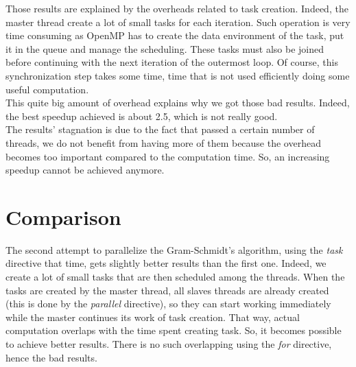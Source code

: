 Those results are explained by the overheads related to task creation. Indeed, the master thread create a lot of small tasks for each iteration. Such operation is very time consuming as OpenMP has to create the data environment of the task, put it in the queue and manage the scheduling.  These tasks must also be joined before continuing with the next iteration of the outermost loop. Of course, this synchronization step takes some time, time that is not used efficiently doing some useful computation.\\

This quite big amount of overhead explains why we got those bad results. Indeed, the best speedup achieved is about 2.5, which is not really good.\\

The results' stagnation is due to the fact that passed a certain number of threads, we do not benefit from having more of them because the overhead becomes too important compared to the computation time. So, an increasing speedup cannot be achieved anymore.

\section{Comparison}

The second attempt to parallelize the Gram-Schmidt's algorithm, using the \textit{task} directive that time, gets slightly better results than the first one. Indeed, we create a lot of small tasks that are then scheduled among the threads. When the tasks are created by the master thread, all slaves threads are already created (this is done by the \textit{parallel} directive), so they can start working immediately while the master continues its work of task creation. That way, actual computation overlaps with the time spent creating task. So, it becomes possible to achieve better results. There is no such overlapping using the \textit{for} directive, hence the bad results.
